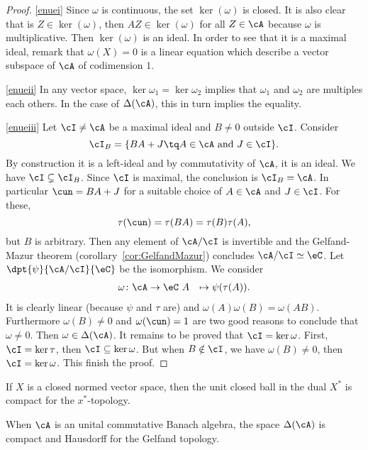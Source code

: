 \begin{proof}
\ref{enuei} Since $\omega$ is continuous, the set $\ker(\omega)$ is closed. It is also clear that is $Z\in\ker(\omega)$, then $AZ\in\ker(\omega)$ for all $Z\in\cA$ because $\omega$ is multiplicative. Then $\ker(\omega)$ is an ideal. In order to see that it is a maximal ideal, remark that $\omega(X)=0$ is a linear equation which describe a vector subspace of $\cA$ of codimension\label{pg_codimun} $1$.

\ref{enueii} In any vector space, $\ker{\omega_1}=\ker{\omega_2}$ implies that $\omega_1$ and $\omega_2$ are multiples each others. In the case of $\Delta(\cA)$, this in turn implies the equality.

\ref{enueiii} Let $\cI\neq\cA$ be a maximal ideal and $B\neq 0$ outside $\cI$. Consider
\[
\cI_B=\{BA+J\tq A\in\cA\textrm{ and }J\in\cI\}.
\]
By construction it is a left-ideal and by commutativity of $\cA$, it is an ideal. We have $\cI\subsetneq\cI_B$. Since $\cI$ is maximal, the conclusion is $\cI_B=\cA$. In particular $\cun=BA+J$ for a suitable choice of $A\in\cA$ and $J\in\cI$. For these,
\[
  \tau(\cun)=\tau(BA)=\tau(B)\tau(A),
\]
but $B$ is arbitrary. Then any element of $\cA/\cI$ is invertible and the Gelfand-Mazur theorem (corollary~\ref{cor:GelfandMazur}) concludes $\cA/\cI\simeq\eC$. Let $\dpt{\psi}{\cA/\cI}{\eC}$ be the isomorphism. We consider
        \begin{equation}
        \begin{aligned}
            \omega \colon \cA &\to \eC\
            A&\mapsto \psi(\tau(A)).
        \end{aligned}
    \end{equation}
It is clearly linear (because $\psi$ and $\tau$ are) and $\omega(A)\omega(B)=\omega(AB)$. Furthermore $\omega(B)\neq 0$ and $\omega(\cun)=1$ are two good reasons to conclude that $\omega\neq 0$. Then $\omega\in\Delta(\cA)$. It remains to be proved that $\cI=\ker\omega$. First, $\cI=\ker\tau$, then $\cI\subseteq\ker\omega$. But when $B\notin\cI$, we have $\omega(B)\neq 0$, then $\cI=\ker\omega$. This finish the proof.
\end{proof}


\begin{theorem}
If $X$ is a closed normed vector space, then the unit closed ball in the dual $X^*$ is compact for the $x^*$-topology.
 \label{tho:Banach_Alaoglu}
\end{theorem}

\begin{proposition}
When $\cA$ is an unital commutative Banach algebra, the space $\Delta(\cA)$ is compact and Hausdorff for the Gelfand topology.
\end{proposition} \label{prop:DcA_comp_Hauss}


